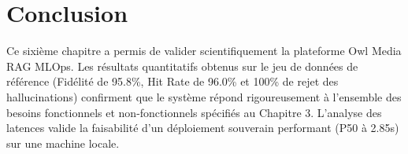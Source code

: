 \section{Conclusion}
Ce sixième chapitre a permis de valider scientifiquement la plateforme Owl Media RAG MLOps. Les résultats quantitatifs obtenus sur le jeu de données de référence (Fidélité de 95.8\%, Hit Rate de 96.0\% et 100\% de rejet des hallucinations) confirment que le système répond rigoureusement à l'ensemble des besoins fonctionnels et non-fonctionnels spécifiés au Chapitre 3. L'analyse des latences valide la faisabilité d'un déploiement souverain performant (P50 à 2.85s) sur une machine locale.
